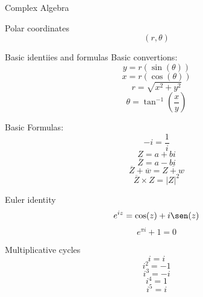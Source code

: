 \begin{section}{Complex Algebra}
	\begin{subsection}{Polar coordinates}
		$$(r,\theta) $$

	\end{subsection}
	\begin{subsection}{Basic identiies and formulas}
		Basic convertions:
		$$y = r ( \sin (\theta) ) $$
		$$x = r ( \cos (\theta) ) $$
		$$r = \sqrt{x^2 + y^2} $$
		$$\theta = \tan^{-1} (\frac{x}{y} ) $$

		Basic Formulas:
		$$-i  = \frac{1}{i} $$
		$$Z = a + bi$$
		$$\overline{Z} = a - bi $$
		$$ \overline{Z} + \overline{w} = \overline{Z + w}$$
		$$\overline{Z} \times Z = \vert Z \vert^2 $$

	
	\end{subsection}
	\begin{subsection}{Euler identity}
		$$e^{iz} = \cos (z) + i \sen (z) $$
		$$e^{\pi i } +1 = 0 $$
	\end{subsection}

	\begin{subsection}{Multiplicative cycles}
		$$i = i$$
		$$i^2 = -1$$
		$$i^3 = -i$$
		$$i^4 = 1$$
		$$i^5 = i$$


\end{subsection}
\end{section}
